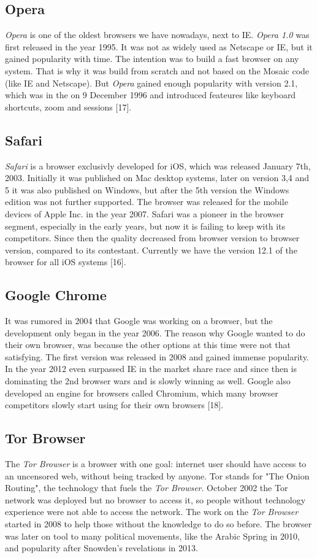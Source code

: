 \documentclass[runningheads]{llncs}
\begin{document}
		\subsection{Opera}
		\textit{Opera} is one of the oldest browsers we have nowadays, next to IE. \textit{Opera 1.0} was first released in the year 1995. It was not as widely used as Netscape or IE, but it gained popularity with time. The intention was to build a fast browser on any system. That is why it was build from scratch and not based on the Mosaic code (like IE and Netscape). But \textit{Opera} gained enough popularity with version 2.1, which was in the on 9 December 1996 and introduced feateures like keyboard shortcuts, zoom and sessions [17].
		\subsection{Safari}
		\textit{Safari} is a browser exclusivly developed for iOS, which was released January 7th, 2003. Initially it was published on Mac desktop systems, later on version 3,4 and 5 it was also published on Windows, but after the 5th version the Windows edition was not further supported. The browser was released for the mobile devices of Apple Inc. in the year 2007. Safari was a pioneer in the browser segment, especially in the early years, but now it is failing to keep with its competitors. Since then the quality decreased from browser version to browser version, compared to its contestant. Currently we have the version 12.1 of the browser for all iOS systems [16].
		\subsection{Google Chrome}
		It was rumored in 2004 that Google was working on a browser, but the development only began in the year 2006. The reason why Google wanted to do their own browser, was because the other options at this time were not that satisfying. The first version was released in 2008 and gained immense popularity. In the year 2012 even surpassed IE in the market share race and since then is dominating the 2nd browser wars and is slowly winning as well. Google also developed an engine for browsers called Chromium, which many browser competitors slowly start using for their own browsers [18].
		\subsection{Tor Browser}
		The \textit{Tor Browser} is a browser with one goal: internet user should have access to an uncensored web, without being tracked by anyone. Tor stands for "The Onion Routing", the technology that fuels the \textit{Tor Browser}. October 2002 the Tor network was deployed but no browser to access it, so people without technology experience were not able to access the network. The work on the \textit{Tor Browser} started in 2008 to help those without the knowledge to do so before. The browser was later on tool to many political movements, like the Arabic Spring in 2010, and popularity after Snowden's revelations in 2013.
\end{document}
